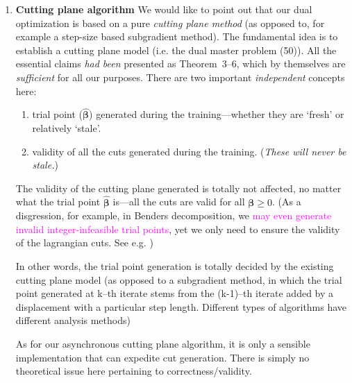 \documentclass[11pt]{article}
\begin{document}
\begin{enumerate}
    \item \textbf{Cutting plane algorithm} \label{ctplnalgo} We would like to point out that our dual optimization is based on a pure \textit{cutting plane method} (as opposed to, for example a step-size based subgradient method). The fundamental idea is to establish a cutting plane model (i.e. the dual master problem (50)). All the essential claims \textit{had been} presented as Theorem~3--6, which by themselves are \textit{sufficient} for all our purposes. There are two important \textit{independent} concepts here: \begin{enumerate}
        \item trial point ($\hat{\boldsymbol{\beta}}$) generated during the training---whether they are `fresh' or relatively `stale'.
        \item validity of all the cuts generated during the training. (\textit{These will never be stale.})
    \end{enumerate}
    The validity of the cutting plane generated is totally not affected, no matter what the trial point $\hat{\boldsymbol{\beta}}$ is---all the cuts are valid for all $\boldsymbol{\beta} \ge 0$. (As a disgression, for example, in Benders decomposition, we \textcolor{magenta}{may even generate invalid integer-infeasible trial points}, yet we only need to ensure the validity of the lagrangian cuts. See e.g. \cite{thebdd})
    \par
    In other words, the trial point generation is totally decided by the existing cutting plane model (as opposed to a subgradient method, in which the trial point generated at k--th iterate stems from the (k-1)--th iterate added by a displacement with a particular step length. Different types of algorithms have different analysis methods)
    \par
    As for our asynchronous cutting plane algorithm, it is only a sensible implementation that can expedite cut generation. There is simply no theoretical issue here pertaining to correctness/validity.


\end{enumerate}
\end{document}
